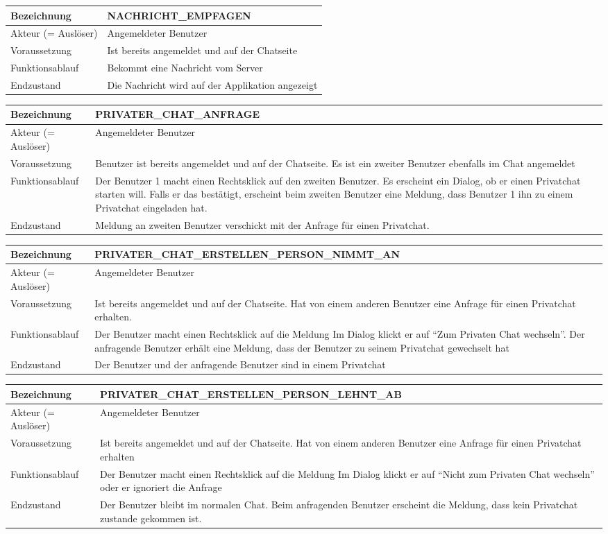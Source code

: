 \documentclass[12pt]{article}
\newcommand{\requirementTable}[5]{
    \begin{table}[H]
      \begin{tabularx}{\textwidth}{|l|X|}
        \hline
        Bezeichnung & #1  \\ \hline
        Akteur (= Auslöser) & #2  \\ \hline
        Voraussetzung & #3  \\ \hline
        Funktionsablauf & #4  \\ \hline
        Endzustand & #5  \\ \hline
      \end{tabularx}
    \end{table}
}
\begin{document}
        \requirementTable
            {NACHRICHT\_EMPFAGEN}
            {Angemeldeter Benutzer}
            {Ist bereits angemeldet und auf der Chatseite}
            {Bekommt eine Nachricht vom Server}
            {Die Nachricht wird auf der Applikation angezeigt}
            
                   
        \requirementTable
            {PRIVATER\_CHAT\_ANFRAGE}
            {Angemeldeter Benutzer}
            {
            Benutzer ist bereits angemeldet und auf der Chatseite. \newline
            Es ist ein zweiter Benutzer ebenfalls im Chat angemeldet
            }
            {
            Der Benutzer 1 macht einen Rechtsklick auf den zweiten Benutzer. \newline
            Es erscheint ein Dialog, ob er einen Privatchat starten will. \newline
            Falls er das bestätigt, erscheint beim zweiten Benutzer eine Meldung, dass Benutzer 1 ihn zu einem Privatchat eingeladen hat.
            }
            {Meldung an zweiten Benutzer verschickt mit der Anfrage für einen Privatchat.}
            
                   
        \requirementTable
            {PRIVATER\_CHAT\_ERSTELLEN\_PERSON\_\newline NIMMT\_AN }
            {Angemeldeter Benutzer}
            {
            Ist bereits angemeldet und auf der Chatseite. \newline
            Hat von einem anderen Benutzer eine Anfrage für einen Privatchat erhalten.}
            {
            Der Benutzer macht einen Rechtsklick auf die Meldung Im Dialog klickt er auf “Zum Privaten Chat wechseln”. \newline
            Der anfragende Benutzer erhält eine Meldung, dass der Benutzer zu seinem Privatchat gewechselt hat
            }
            {Der Benutzer und der anfragende Benutzer sind in einem Privatchat}
            
                   
        \requirementTable
            {PRIVATER\_CHAT\_ERSTELLEN\_PERSON\_\newline LEHNT\_AB}
            {Angemeldeter Benutzer}
            {
            Ist bereits angemeldet und auf der Chatseite. \newline
            Hat von einem anderen Benutzer eine Anfrage für einen Privatchat erhalten
            }
            {
            Der Benutzer macht einen Rechtsklick auf die Meldung Im Dialog klickt er auf “Nicht zum Privaten Chat wechseln”\newline
            oder er ignoriert die Anfrage
            }
            {
            Der Benutzer bleibt im normalen Chat. \newline
            Beim anfragenden Benutzer erscheint die Meldung, dass kein Privatchat zustande gekommen ist.
            }
            
\end{document}

